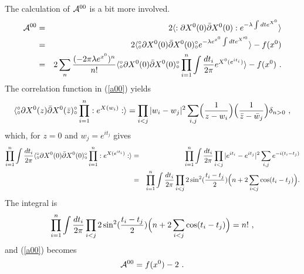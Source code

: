 \documentclass[a4paper,12pt]{article}
\def\p{\partial}
\def\pb{\bar{\partial}}
\def\no{{}^\circ \hspace{-0.16cm} {}_{\circ}}
\begin{document}
The calculation of  ${\cal A}^{0 0}$ is a bit more involved. 
\begin{eqnarray}
{\cal A}^{00}& =& 2\langle :\p X^0(0) \pb X^0(0): e^{-\lambda \int dt e^{X^{0}}} \rangle   \nonumber \\
& = &2\langle  \no \p X^0(0) \pb X^{0}(0) \no  
e^{-\lambda e^{x^0} \int dt e^{X'^0}}\rangle   -  f(x^0) \nonumber \\ 
& = &
2\sum_n {( -2 \pi \lambda e^{x^0})^n  \over n!} \langle \no \p X^0(0) \pb X^0(0) \no   \prod_{i=1}^n \int {dt_i \over {2\pi}} e^{X^0(e^{it_i})} \rangle  -  f(x^0)~. \label{a00} 
\end{eqnarray}
The correlation function in (\ref{a00}) yields
\begin{equation}
\langle \no \p X^0(z) \pb X^0({\bar z})\no \prod_{i=1}^n :e^{X(w_i)}: \rangle = \prod_{i< j}|w_i -w_j|^2\sum_{i,j} \Bigl({1 \over {z-w_i}}\Bigr) \Bigl({1 \over {\bar{z}-\bar{w}_j}}\Bigr) \delta_{n>0}~,
\end{equation}
which, for $z=0$ and $w_j=e^{it_j}$ gives 
\begin{eqnarray}
\prod_{i=1}^n \int {dt_i \over {2\pi}} 
\langle \no \p X^0(0) \pb X^0(0)\no  \prod_{i=1}^n :e^{X(e^{it_i})}: \rangle &=&
\prod_{i=1}^n \int {dt_i \over {2\pi}} 
\prod_{i< j}|e^{it_i}-e^{it_j}|^2 \sum_{i,j}e^{-i(t_i-t_j)} \nonumber \\
&=& 
\prod_{i=1}^n \int {dt_i \over {2\pi}} 
\prod_{i< j}2\sin^2({t_i-t_j \over 2})\Bigl(n+2 \sum_{i<j}\cos(t_i-t_j) \Bigr). \nonumber 
\end{eqnarray}
The integral is
\begin{equation}
\prod_{i=1}^n \int {dt_i \over {2\pi}} 
\prod_{i< j}2\sin^2({t_i-t_j \over 2})\Bigl(n+2 \sum_{i<j}\cos(t_i-t_j)\Bigr) \nonumber 
=
n!~, 
\end{equation}
and  (\ref{a00}) becomes
\begin{equation}
{\cal A}^{00}= f(x^0)-2~.
\end{equation}
\end{document}
